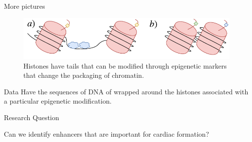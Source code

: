 \documentclass{beamer}
\begin{document}
    \begin{frame}{More pictures}
        \begin{figure}
            \centering
            \includegraphics[width = \textwidth]{OpenCloseChromatinEpi.pdf}
            \caption{Histones have tails that can be modified through epigenetic markers that change the packaging of chromatin.}
            \label{fig:yote}
        \end{figure}
        
        \begin{block}{Data}
        Have the sequences of DNA of wrapped around the histones associated with a particular epigenetic modification.
        \end{block}
    \end{frame}
    
    \begin{frame}{Research Question}
           
        \begin{center}
            Can we identify enhancers that are important for cardiac formation?
        \end{center}
   \end{frame}

 
        
        
                        
\end{document}
